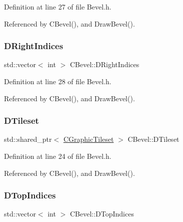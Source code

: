 Definition at line 27 of file Bevel.\+h.



Referenced by C\+Bevel(), and Draw\+Bevel().

\hypertarget{classCBevel_a52160856e5fbb45c4c1d6e433089ab05}{}\label{classCBevel_a52160856e5fbb45c4c1d6e433089ab05} 
\subsubsection{\texorpdfstring{D\+Right\+Indices}{DRightIndices}}
{\footnotesize\ttfamily std\+::vector$<$ int $>$ C\+Bevel\+::\+D\+Right\+Indices\hspace{0.3cm}{\ttfamily [protected]}}



Definition at line 28 of file Bevel.\+h.



Referenced by C\+Bevel(), and Draw\+Bevel().

\hypertarget{classCBevel_a98cbd98b79bc8cffd408f12fee447fb9}{}\label{classCBevel_a98cbd98b79bc8cffd408f12fee447fb9} 
\subsubsection{\texorpdfstring{D\+Tileset}{DTileset}}
{\footnotesize\ttfamily std\+::shared\+\_\+ptr$<$ \hyperlink{classCGraphicTileset}{C\+Graphic\+Tileset} $>$ C\+Bevel\+::\+D\+Tileset\hspace{0.3cm}{\ttfamily [protected]}}



Definition at line 24 of file Bevel.\+h.



Referenced by C\+Bevel(), and Draw\+Bevel().

\hypertarget{classCBevel_a05e4406edf5927df6431f103f7207a1b}{}\label{classCBevel_a05e4406edf5927df6431f103f7207a1b} 
\subsubsection{\texorpdfstring{D\+Top\+Indices}{DTopIndices}}
{\footnotesize\ttfamily std\+::vector$<$ int $>$ C\+Bevel\+::\+D\+Top\+Indices\hspace{0.3cm}{\ttfamily [protected]}}



